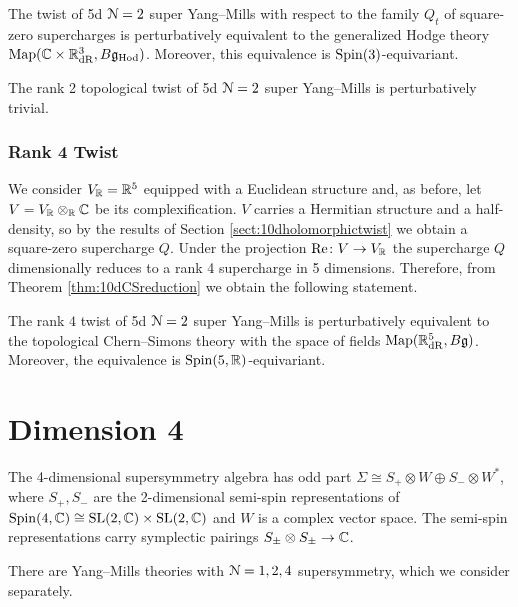 \documentclass[10pt, oneside]{article}
\newcommand{\Hod}{\mathrm{Hod}}
\renewcommand{\Re}{\mathrm{Re}}
\begin{document}
\begin{theorem}
The twist of 5d $\mathcal N=2$ super Yang--Mills with respect to the family $Q_t$ of square-zero supercharges is perturbatively equivalent to the generalized Hodge theory $\map(\CC\times \RR^3_{\mathrm{dR}}, B\fg_{\Hod})$. Moreover, this equivalence is $\mathrm{Spin}(3)$-equivariant.
\label{thm:5dHodgetwist}
\end{theorem}

\begin{corollary}
The rank 2 topological twist of 5d $\mathcal N=2$ super Yang--Mills is perturbatively trivial.
\label{cor:5drank2topologicaltwist}
\end{corollary}

\subsubsection{Rank 4 Twist}
\label{sect:5drank4twist}

We consider $V_\mathbb R=\mathbb R^5$ equipped with a Euclidean structure and, as before, let $V=V_\mathbb R\otimes_\mathbb R\mathbb C$ be its complexification. $V$ carries a Hermitian structure and a half-density, so by the results of Section \ref{sect:10dholomorphictwist} we obtain a square-zero supercharge $Q$. Under the projection $\Re\colon V\rightarrow V_\RR$ the supercharge $Q$ dimensionally reduces to a rank 4 supercharge in 5 dimensions. Therefore, from Theorem \ref{thm:10dCSreduction} we obtain the following statement.

\begin{theorem}
The rank $4$ twist of 5d $\mathcal N=2$ super Yang--Mills is perturbatively equivalent to the topological Chern--Simons theory with the space of fields $\operatorname{Map}(\mathbb R^5_{\mathrm{dR}}, B\mathfrak g)$. Moreover, the equivalence is $\mathrm{Spin}(5, \mathbb R)$-equivariant.
\end{theorem}
 
\section{Dimension 4}

The 4-dimensional supersymmetry algebra has odd part $\Sigma\cong S_+\otimes W\oplus S_-\otimes W^*$, where $S_+, S_-$ are the 2-dimensional semi-spin representations of $\mathrm{Spin}(4, \mathbb C)\cong \mathrm{SL}(2, \mathbb C) \times \mathrm{SL}(2, \mathbb C)$ and $W$ is a complex vector space. The semi-spin representations carry symplectic pairings $S_\pm\otimes S_\pm\rightarrow \mathbb C$.

There are Yang--Mills theories with $\mathcal N=1,2,4$ supersymmetry, which we consider separately.
\end{document}
